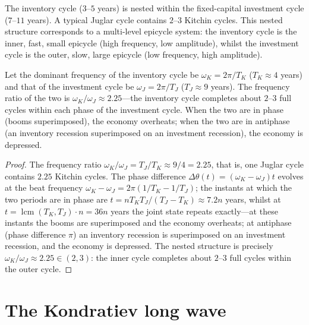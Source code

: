 \begin{proposition}\label{prop:nested_business_cycles}
The inventory cycle ($3$--$5$ years) is nested within the fixed-capital investment cycle ($7$--$11$ years). A typical Juglar cycle contains $2$--$3$ Kitchin cycles. This nested structure corresponds to a multi-level epicycle system: the inventory cycle is the inner, fast, small epicycle (high frequency, low amplitude), whilst the investment cycle is the outer, slow, large epicycle (low frequency, high amplitude).

Let the dominant frequency of the inventory cycle be $\omega_K = 2\pi/T_K$ ($T_K \approx 4$ years) and that of the investment cycle be $\omega_J = 2\pi/T_J$ ($T_J \approx 9$ years). The frequency ratio of the two is $\omega_K/\omega_J \approx 2.25$---the inventory cycle completes about $2$--$3$ full cycles within each phase of the investment cycle. When the two are in phase (booms superimposed), the economy overheats; when the two are in antiphase (an inventory recession superimposed on an investment recession), the economy is depressed.
\end{proposition}

\begin{proof}
The frequency ratio $\omega_K/\omega_J = T_J/T_K \approx 9/4 = 2.25$, that is, one Juglar cycle contains $2.25$ Kitchin cycles. The phase difference $\Delta\theta(t) = (\omega_K - \omega_J)t$ evolves at the beat frequency $\omega_K - \omega_J = 2\pi(1/T_K - 1/T_J)$; the instants at which the two periods are in phase are $t = nT_KT_J/(T_J-T_K)\approx7.2n$ years, whilst at $t = \operatorname{lcm}(T_K, T_J) \cdot n = 36n$ years the joint state repeats exactly---at these instants the booms are superimposed and the economy overheats; at antiphase (phase difference $\pi$) an inventory recession is superimposed on an investment recession, and the economy is depressed. The nested structure is precisely $\omega_K/\omega_J \approx 2.25 \in (2,3)$: the inner cycle completes about $2$--$3$ full cycles within the outer cycle.
\end{proof}

\section{The Kondratiev long wave}

